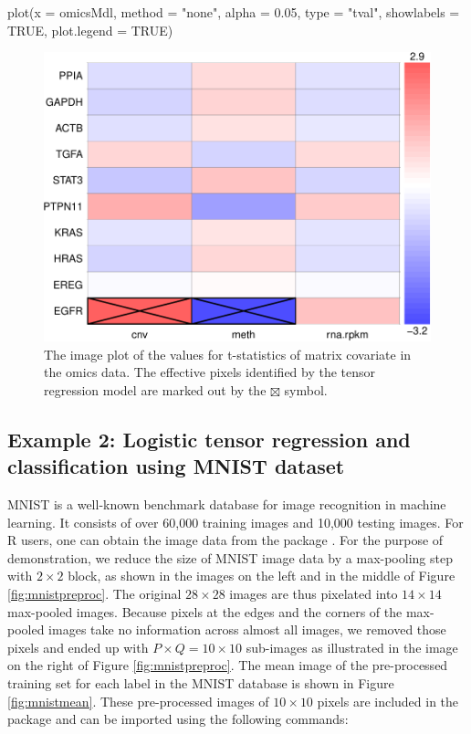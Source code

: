 \begin{Schunk}
\begin{Sinput}
plot(x = omicsMdl, method = "none", alpha = 0.05, type = "tval",
     showlabels = TRUE, plot.legend = TRUE) 
\end{Sinput}
\begin{figure}

{\centering \includegraphics[width=0.45\linewidth]{chen-chang-chen-tzeng-chang_files/figure-latex/omicsplot-1} 

}

\caption[The image plot of the values for t-statistics of matrix covariate in the omics data]{The image plot of the values for t-statistics of matrix covariate in the omics data.  The effective pixels identified by the tensor regression model are marked out by the $\boxtimes$ symbol.}\label{fig:omicsplot}
\end{figure}
\end{Schunk}

\hypertarget{example-2-logistic-tensor-regression-and-classification-using-mnist-dataset}{%
\subsection{Example 2: Logistic tensor regression and classification
using MNIST
dataset}\label{example-2-logistic-tensor-regression-and-classification-using-mnist-dataset}}

MNIST is a well-known benchmark database for image recognition in
machine learning. It consists of over 60,000 training images and 10,000
testing images. For R users, one can obtain the image data from the
 package \citep{rafael2019dslabs}. For the purpose of
demonstration, we reduce the size of MNIST image data by a max-pooling
step with \(2 \times 2\) block, as shown in the images on the left and
in the middle of Figure \ref{fig:mnistpreproc}. The original
\(28 \times 28\) images are thus pixelated into \(14 \times 14\)
max-pooled images. Because pixels at the edges and the corners of the
max-pooled images take no information across almost all images, we
removed those pixels and ended up with \(P\times Q = 10 \times 10\)
sub-images as illustrated in the image on the right of Figure
\ref{fig:mnistpreproc}. The mean image of the pre-processed training set
for each label in the MNIST database is shown in Figure
\ref{fig:mnistmean}. These pre-processed images of \(10 \times 10\)
pixels are included in the package  and can be
imported using the following commands:

